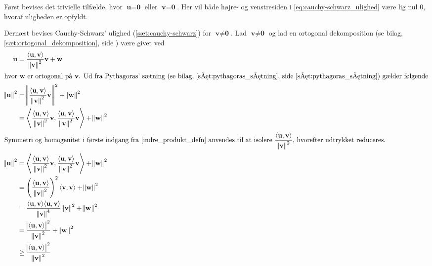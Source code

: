 \begin{bev}\textbf{}
\newline
Først bevises det trivielle tilfælde, hvor $\textbf{u}=\textbf{0}$ eller $\textbf{v}=\textbf{0}$. Her vil både højre- og venstresiden i \eqref{eq:cauchy-schwarz_ulighed} være lig nul $0$, hvoraf uligheden er opfyldt.

Dernæst bevises Cauchy-Schwarz' ulighed (\autoref{sæt:cauchy-schwarz}) for $\textbf{v}\neq\textbf{0}$. Lad $\textbf{v} \neq \textbf{0}$ og lad en ortogonal dekomposition (se bilag, \autoref{sæt:ortogonal_dekomposition}, side \pageref{sæt:ortogonal_dekomposition}) være givet ved
\begin{align*}
    \textbf{u}&=\frac{\langle\textbf{u},\textbf{v}\rangle}{\norm{\textbf{v}}^2}\textbf{v}+\textbf{w} \\
\intertext{hvor $\textbf{w}$ er ortogonal på $\textbf{v}$. Ud fra Pythagoras' sætning (se bilag, \autoref{sæt:pythagoras_sætning}, side \pageref{sæt:pythagoras_sætning}) gælder følgende}
    \norm{\textbf{u}}^2
    &=\norm{\frac{\langle\textbf{u},\textbf{v}\rangle}{\norm{\textbf{v}}^2}\textbf{v}}^2+\norm{\textbf{w}}^2 \\
    &= \left\langle {\frac{\langle\textbf{u},\textbf{v}\rangle}{\norm{\textbf{v}}^2}\textbf{v}} , {\frac{\langle\textbf{u},\textbf{v}\rangle}{\norm{\textbf{v}}^2}\textbf{v}} \right\rangle + \norm{\textbf{w}}^2 \\
\intertext{Symmetri og homogenitet i første indgang fra \autoref{indre_produkt_defn} anvendes til at isolere $\displaystyle\frac{\langle\textbf{u},\textbf{v}\rangle}{\norm{\textbf{v}}^2}$, hvorefter udtrykket reduceres.}
    \norm{\textbf{u}}^2 &=
    \left\langle {\frac{\langle\textbf{u},\textbf{v}\rangle}{\norm{\textbf{v}}^2}\textbf{v}} , {\frac{\langle\textbf{u},\textbf{v}\rangle}{\norm{\textbf{v}}^2}\textbf{v}} \right\rangle + \norm{\textbf{w}}^2 \\
    &=  \left(\frac{\langle\textbf{u},\textbf{v}\rangle}{\norm{\textbf{v}}^2}\right)^2\langle\textbf{v},\textbf{v}\rangle + \norm{\textbf{w}}^2\\
    &= {\frac{\langle\textbf{u},\textbf{v}\rangle{\langle\textbf{u},\textbf{v}\rangle}}{\norm{\textbf{v}}^4}\norm{\textbf{v}}^2} + \norm{\textbf{w}}^2 \\
    &= \frac{\abs{\langle\textbf{u},\textbf{v}\rangle}^2}{\norm{\textbf{v}}^2}+\norm{\textbf{w}}^2 \\
    &\geq \frac{\abs{\langle\textbf{u},\textbf{v}\rangle}^2}{\norm{\textbf{v}}^2}\\

\end{align*}
\end{bev}
